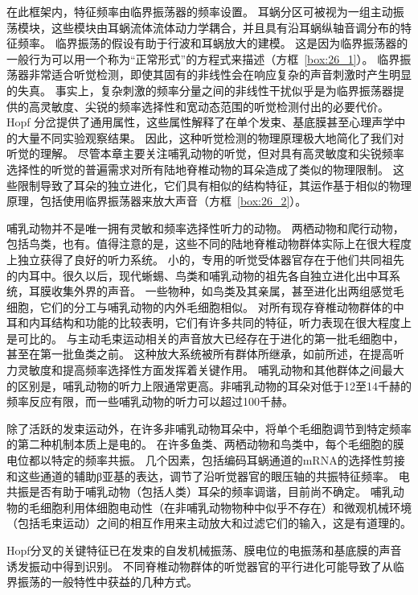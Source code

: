 在此框架内，特征频率由临界振荡器的频率设置。
耳蜗分区可被视为一组主动振荡模块，这些模块由耳蜗流体流体动力学耦合，并且具有沿耳蜗纵轴音调分布的特征频率。
临界振荡的假设有助于行波和耳蜗放大的建模。
这是因为临界振荡器的一般行为可以用一个称为“正常形式”的方程式来描述（方框~\ref{box:26_1}）。
临界振荡器非常适合听觉检测，即使其固有的非线性会在响应复杂的声音刺激时产生明显的失真。
事实上，复杂刺激的频率分量之间的非线性干扰似乎是为临界振荡器提供的高灵敏度、尖锐的频率选择性和宽动态范围的听觉检测付出的必要代价。
Hopf 分岔提供了通用属性，这些属性解释了在单个发束、基底膜甚至心理声学中的大量不同实验观察结果。
因此，这种听觉检测的物理原理极大地简化了我们对听觉的理解。
尽管本章主要关注哺乳动物的听觉，但对具有高灵敏度和尖锐频率选择性的听觉的普遍需求对所有陆地脊椎动物的耳朵造成了类似的物理限制。
这些限制导致了耳朵的独立进化，它们具有相似的结构特征，其运作基于相似的物理原理，包括使用临界振荡器来放大声音（方框~\ref{box:26_2}）。


\begin{proposition}[听觉的进化史导致了群体之间的相似性] \label{box:26_2}
	
	\quad \quad 哺乳动物并不是唯一拥有灵敏和频率选择性听力的动物。
	两栖动物和爬行动物，包括鸟类，也有。值得注意的是，这些不同的陆地脊椎动物群体实际上在很大程度上独立获得了良好的听力系统。
	小的，专用的听觉受体器官存在于他们共同祖先的内耳中。很久以后，现代蜥蜴、鸟类和哺乳动物的祖先各自独立进化出中耳系统，耳膜收集外界的声音。
	一些物种，如鸟类及其亲属，甚至进化出两组感觉毛细胞，它们的分工与哺乳动物的内外毛细胞相似。
	对所有现存脊椎动物群体的中耳和内耳结构和功能的比较表明，它们有许多共同的特征，听力表现在很大程度上是可比的。
	与主动毛束运动相关的声音放大已经存在于进化的第一批毛细胞中，甚至在第一批鱼类之前。
	这种放大系统被所有群体所继承，如前所述，在提高听力灵敏度和提高频率选择性方面发挥着关键作用。
	哺乳动物和其他群体之间最大的区别是，哺乳动物的听力上限通常更高。非哺乳动物的耳朵对低于12至14千赫的频率反应有限，而一些哺乳动物的听力可以超过100千赫。
	
	\quad \quad 除了活跃的发束运动外，在许多非哺乳动物耳朵中，将单个毛细胞调节到特定频率的第二种机制本质上是电的。
	在许多鱼类、两栖动物和鸟类中，每个毛细胞的膜电位都以特定的频率共振。
	几个因素，包括编码耳蜗通道的mRNA的选择性剪接和这些通道的辅助β亚基的表达，调节了沿听觉器官的眼压轴的共振特征频率。
	电共振是否有助于哺乳动物（包括人类）耳朵的频率调谐，目前尚不确定。
	哺乳动物的毛细胞利用体细胞电动性（在非哺乳动物物种中似乎不存在）和微观机械环境（包括毛束运动）之间的相互作用来主动放大和过滤它们的输入，这是有道理的。
	
	\quad \quad Hopf分叉的关键特征已在发束的自发机械振荡、膜电位的电振荡和基底膜的声音诱发振动中得到识别。
	不同脊椎动物群体的听觉器官的平行进化可能导致了从临界振荡的一般特性中获益的几种方式。
	
\end{proposition}


